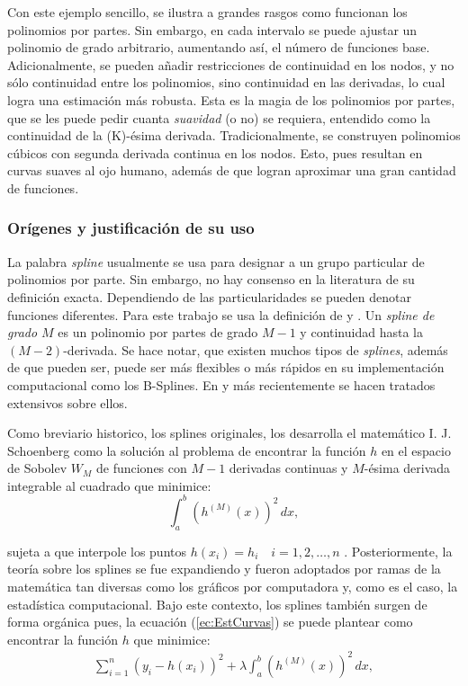 \documentclass[../Main/Main.tex]{subfiles}
\begin{document}
Con este ejemplo sencillo, se ilustra a grandes rasgos como funcionan los polinomios por partes. Sin embargo, en cada intervalo se puede ajustar un polinomio de grado arbitrario, aumentando así, el número de funciones base. Adicionalmente, se pueden añadir restricciones de continuidad en los nodos, y no sólo continuidad entre los polinomios, sino continuidad en las derivadas, lo cual logra una estimación más robusta. Esta es la magia de los polinomios por partes, que se les puede pedir cuanta \textit{suavidad} (o no) se requiera, entendido como la continuidad de la (K)-ésima derivada. Tradicionalmente, se construyen polinomios cúbicos con segunda derivada continua en los nodos. Esto, pues resultan en curvas suaves al ojo humano, además de que logran aproximar una gran cantidad de funciones.

\subsubsection{Orígenes y justificación de su uso}
La palabra \textit{spline} usualmente se usa para designar a un grupo particular de polinomios por parte. Sin embargo, no hay consenso en la literatura de su definición exacta. Dependiendo de las particularidades se pueden denotar funciones diferentes. Para este trabajo se usa la definición de \citet{wasserman2007all} y \citet{hastie2008elements}.  Un \textit{spline de grado $M$} es un polinomio por partes de grado $M-1$ y continuidad hasta la $(M-2)$-derivada. Se hace notar, que existen muchos tipos de \textit{splines}, además de que pueden ser, puede ser más flexibles o más rápidos en su implementación computacional como los B-Splines. En \citet{deboor1978splines} y más recientemente \citet{wahba1990splines} se hacen tratados extensivos sobre ellos.

Como breviario historico, los splines originales, los desarrolla  el matemático I. J. Schoenberg como la solución al problema de encontrar la función $h$ en el espacio de Sobolev $W_{M}$ de funciones con $M-1$ derivadas continuas y $M$-ésima derivada integrable al cuadrado que minimice:
$$\int_a^b(h^{(M)}(x))^2\,dx,$$ 

sujeta a que interpole los puntos $h(x_i) = h_i \quad i = 1,2,\ldots,n$ \autocite{schoenberg1964spline}. Posteriormente, la teoría sobre los splines se fue expandiendo y fueron adoptados por ramas de la matemática tan diversas como los gráficos por computadora y, como es el caso, la estadística computacional. Bajo este contexto, los splines también surgen de forma orgánica pues, la ecuación (\ref{ec:EstCurvas}) se puede plantear como encontrar la función $h$ que minimice:
\begin{align}
	\sum_{i=1}^n(y_i - h(x_i))^2 + \lambda\int_a^b (h^{(M)}(x))^2 \, dx, \label{ec:SplinesConRegularizacion}
\end{align}
\end{document}
